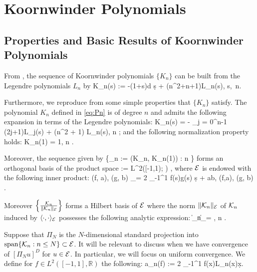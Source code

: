 
\section{Koornwinder Polynomials}


\subsection{Properties and Basic Results of Koornwinder Polynomials}

From \cite[Eq.~(2.1)]{Koornwinder}, the sequence of Koornwinder polynomials \(\{K_n\}\) can be built from the Legendre polynomials \(L_n\) by 
\be\label{eq:Pn}
    K_n(s) := -(1+s)\frac d {\d s} + (n^2+n+1)L_n(s), \quad s\in[-1,1],\  n\in\Nzero.
\ee

Furthermore, we reproduce from \cite[Prop.~3.1]{GalerkinApprox} some simple properties that \(\{K_n\}\) satisfy.
\bprop
The polynomial \(K_n\) defined in \eqref{eq:Pn} is of degree \(n\) and  admits the following expansion in terms of the Legendre polynomials:
\be\label{eq:Pn2}
    K_n(s) = - \sum_{j = 0}^{n-1} (2j+1)L_j(s) + (n^2 + 1) L_n(s), \qquad n \in \Nzero;
\ee
and the following normalization property holds:
\be
    K_n(1) = 1, \qquad n \in \Nzero.
\ee

Moreover, the sequence given by
\be
    \{_n := (K_n, K_n(1)) : n \in \Nzero\}
\ee 
forms an orthogonal basis of the  product space 
\be
     := L^2([-1,1); \R) \times  \R,
\ee 
where \(\mathcal E\) is endowed with the following inner product:
\be
    \langle (f, a), (g, b) \rangle_\mcE =  2 \int_{-1}^1 f(s)g(s) \d s  + ab, \quad (f,a), (g, b) \in \mcE.
\ee

Moreover \(\left\{ \frac{\mathcal K_n}{\| \mathcal K_n \|_\mathcal E} \right\}\) forms a Hilbert basis of $\mathcal E$ where 
the norm \(\| \mathcal K_n \|_\mathcal E\) of \(\mathcal K_n\) induced by  \(\langle \cdot, \cdot \rangle_\mathcal E\)  possesses the following analytic expression:
\be \label{eq:Pn_norm}
    \|\mcK_n\|_\mcE = , \qquad n \in \Nzero.
\ee
\eprop

Suppose that \(\Pi_N\) is the \(N\)-dimensional standard projection into \(\mbox{span}\{\mathcal K_n: n\leq N\} \subset \mathcal E\). It will be relevant to discuss when we have convergence of \([\Pi_N u]^D\) for \(u\in\mathcal E\). In particular, we will focus on uniform convergence. We define for \(f\in L^2([-1,1], \mathbb R)\) the following:
\be
a_n(f) :=  2 \int_{-1}^1 f(x)L_n(x)\d x.
\ee

